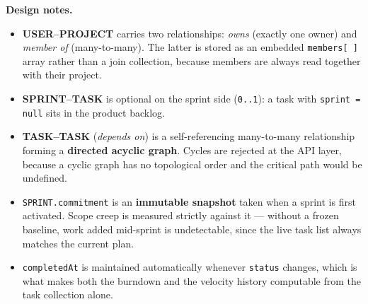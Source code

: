 \documentclass[11pt]{article}
\begin{document}
\begin{center}
\begin{minipage}{0.92\textwidth}
\smallskip
\textbf{Design notes.}
\begin{itemize}\setlength{\itemsep}{1.5pt}
  \item \textbf{USER--PROJECT} carries two relationships: \textit{owns} (exactly one
        owner) and \textit{member of} (many-to-many). The latter is stored as an
        embedded \texttt{members[\,]} array rather than a join collection, because
        members are always read together with their project.
  \item \textbf{SPRINT--TASK} is optional on the sprint side (\texttt{0..1}): a task
        with \texttt{sprint = null} sits in the product backlog.
  \item \textbf{TASK--TASK} (\textit{depends on}) is a self-referencing many-to-many
        relationship forming a \textbf{directed acyclic graph}. Cycles are rejected
        at the API layer, because a cyclic graph has no topological order and the
        critical path would be undefined.
  \item \texttt{SPRINT.commitment} is an \textbf{immutable snapshot} taken when a
        sprint is first activated. Scope creep is measured strictly against it ---
        without a frozen baseline, work added mid-sprint is undetectable, since the
        live task list always matches the current plan.
  \item \texttt{completedAt} is maintained automatically whenever \texttt{status}
        changes, which is what makes both the burndown and the velocity history
        computable from the task collection alone.
\end{itemize}
\end{minipage}

\end{center}
\end{document}
